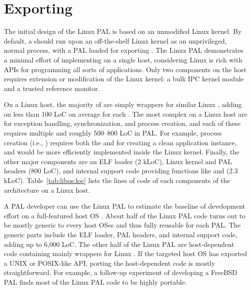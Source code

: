\section{Exporting \thehostabi{}}
\label{sec:linux:impl}

The initial design of the Linux PAL is based on an unmodified Linux kernel.
By default, a \graphene{} \picoproc{} should run upon
an off-the-shelf Linux kernel as an unprivileged, normal process, with a PAL loaded for exporting \thehostabi{}.
The Linux PAL demonstrates a minimal effort of implementing \thehostabi{}
on a single host, considering Linux is rich with APIs for programming all sorts of applications.
Only two \graphene{} components on the host requires extension or modification of the Linux kernel: a bulk IPC kernel module and a trusted reference monitor.



On a Linux host,
the majority of \hostapis{} are simply wrappers
for similar Linux \linuxapis{},
adding on less than 100 LoC on average for each \hostapi{}.
The most complex \hostapis{} on a Linux host are for exception handling, synchronization, and process creation, and each of these \hostapis{} requires multiple \linuxapis{} and roughly 500--800 LoC in PAL.
For example, process creation (i.e., ) requires 
both the  and  \linuxapis{}
for creating a clean
application instance, and would be more efficiently
implemented inside the Linux kernel.
Finally, the other major \pal{} components are an ELF loader (2 kLoC),
Linux kernel and PAL headers (800 LoC),
and internal support code providing functions like  and  (2.3 kLoC).
Table~\ref{tab:libos:loc} lists the lines of code of each components of the \graphene{} architecture on a Linux host.


A PAL developer can use the Linux PAL to estimate the baseline of \thehostabi{} development effort on a full-featured host OS .
About half of the Linux PAL code turns out to be
mostly generic to every host OSes
and thus fully reusable for each PAL.
The generic parts include
the ELF loader, PAL headers, and internal support code, adding up to \roughly{}6,000 LoC.
The other half of the Linux PAL are host-dependent code containing mainly wrappers for Linux \linuxapis{}.
If the targeted host OS has exported a UNIX or POSIX-like API,
porting the host-dependent code is mostly straightforward.
For example, a follow-up experiment of developing a FreeBSD PAL finds most of the Linux PAL code to be highly portable.






